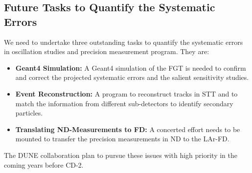 \subsection{Future Tasks to Quantify the Systematic Errors}
\label{cdrsec:detectors-nd-ref-fgt-req-future} 

We need to undertake three outstanding tasks to quantify the systematic errors in oscillation studies 
and precision measurement program. They are: 
\begin{itemize}
    \item {\bf Geant4 Simulation:} A Geant4 simulation of the FGT is needed to confirm and correct 
    the projected systematic errors and  the salient sensitivity studies. 
     \item {\bf Event Reconstruction:} A program to reconstruct tracks in STT and to match the 
     information from different sub-detectors to identify secondary particles.  
     \item {\bf Translating ND-Measurements to FD:} A concerted effort needs to be mounted to transfer 
     the precision measurements in ND to the LAr-FD. 
\end{itemize}    
The DUNE collaboration plan to pursue these issues with high priority in the coming years before CD-2. 

